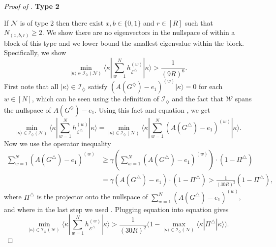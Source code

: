 \documentclass[../thesis-main/thesis-main]{subfiles}
\begin{document}
\begin{proof}[Proof of \protect{}]
\medskip

\noindent \textbf{Type 2}

\smallskip

\noindent If $\mathcal{N}$ is of type 2 then there exist $x,b\in\{0,1\}$ and $r\in[R]$ such that $N_{(x,b,r)}\geq2$. We show there are no eigenvectors in the nullspace of  within a block of this type and we lower bound the smallest eigenvalue within the block. Specifically, we show
\begin{equation}
\min_{|\kappa\rangle\in\mathcal{I}_{\diamondsuit}(\mathcal{N})}\langle\kappa|\sum_{w=1}^{N}h_{\mathcal{E}^{\triangle}}^{(w)}|\kappa\rangle >\frac{1}{(9R)^6}.\label{eq:boundfortype2}
\end{equation}
First note that all $|\kappa\rangle\in\mathcal{I}_{\diamondsuit}$ satisfy $(A(G^{\diamondsuit})-e_{1})^{(w)}|\kappa\rangle=0$ for each $w\in [N]$, which can be seen using the definition of $\mathcal{I}_{\diamondsuit}$ and the fact that $\mathcal{W}$ spans the nullspace of $A(G^{\diamondsuit})-e_{1}$. Using this fact and equation , we get
\begin{equation}
\min_{|\kappa\rangle\in\mathcal{I}_{\diamondsuit}(\mathcal{N})}\langle\kappa|\sum_{w=1}^{N}h_{\mathcal{E}^{\triangle}}^{(w)}|\kappa\rangle=\min_{|\kappa\rangle\in\mathcal{I}_{\diamondsuit}(\mathcal{N})}\langle\kappa|\sum_{w=1}^{N}\left(A(G^{\triangle})-e_{1}\right)^{(w)}|\kappa\rangle.\label{eq:min_over_blockFbl}
\end{equation}
Now we use the operator inequality 
\begin{align}
  \sum_{w=1}^{N}\left(A(G^{\triangle})-e_{1}\right)^{(w)}
  & \geq\gamma\left(\sum_{w=1}^{N}\left(A(G^{\triangle})-e_{1}\right)^{(w)}\right)\cdot
    \left(1-\Pi^{\triangle}\right) \nonumber \\
  &= \gamma(A(G^{\triangle})-e_{1})\cdot\left(1-\Pi^{\triangle}\right)
   > \frac{1}{(30R)^{2}}\left(1-\Pi^{\triangle}\right),
\label{eq:op_ineq_A_Gtriangle}
\end{align}
where $\Pi^{\triangle}$ is the projector onto the nullspace of $\sum_{w=1}^{N}\left(A(G^{\triangle})-e_{1}\right)^{(w)}$, and where in the last step we used . Plugging equation  into equation  gives
\begin{equation}
\min_{|\kappa\rangle\in\mathcal{I}_{\diamondsuit}(\mathcal{N})}\langle\kappa|\sum_{w=1}^{N}h_{\mathcal{E}^{\triangle}}^{(w)}|\kappa\rangle>\frac{1}{(30R)^{2}}\Big(1-\max_{|\kappa\rangle\in\mathcal{I}_{\diamondsuit}(\mathcal{N})}\langle\kappa|\Pi^{\triangle}|\kappa\rangle\Big).\label{eq:bound1}
\end{equation}


\end{proof}
\end{document}
